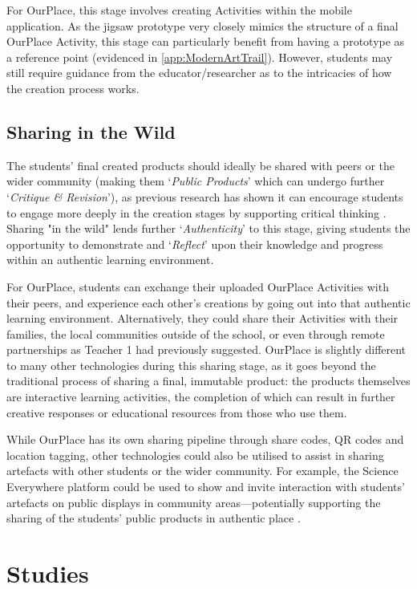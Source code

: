 For OurPlace, this stage involves creating Activities within the mobile application. As the jigsaw prototype very closely mimics the structure of a final OurPlace Activity, this stage can particularly benefit from having a prototype as a reference point (evidenced in \ref{app:ModernArtTrail}). However, students may still require guidance from the educator/researcher as to the intricacies of how the creation process works.

\subsection{Sharing in the Wild}
The students' final created products should ideally be shared with peers or the wider community (making them `\textit{Public Products}' which can undergo further `\textit{Critique \& Revision}'), as previous research has shown it can encourage students to engage more deeply in the creation stages by supporting critical thinking \citep{Sarangapani2018, Heslop2017}. Sharing "in the wild" lends further `\textit{Authenticity}' to this stage, giving students the opportunity to demonstrate and `\textit{Reflect}' upon their knowledge and progress within an authentic learning environment.

For OurPlace, students can exchange their uploaded OurPlace Activities with their peers, and experience each other's creations by going out into that authentic learning environment. Alternatively, they could share their Activities with their families, the local communities outside of the school, or even through remote partnerships as Teacher 1 had previously suggested. OurPlace is slightly different to many other technologies during this sharing stage, as it goes beyond the traditional process of sharing a final, immutable product: the products themselves are interactive learning activities, the completion of which can result in further creative responses or educational resources from those who use them. 

While OurPlace has its own sharing pipeline through share codes, QR codes and location tagging, other technologies could also be utilised to assist in sharing artefacts with other students or the wider community. For example, the Science Everywhere platform could be used to show and invite interaction with students' artefacts on public displays in community areas---potentially supporting the sharing of the students' public products in authentic place \citep{ahn2018}.

\section{Studies}

